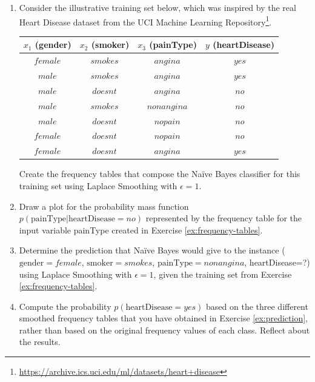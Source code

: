 \begin{enumerate}

\item \label{ex:frequency-tables} Consider the illustrative training set below, which was inspired by the real Heart Disease dataset from the UCI Machine Learning Repository\footnote{\url{https://archive.ics.uci.edu/ml/datasets/heart+disease}}.

\begin{center}
\begin{tabular}{|c|c|c||c|}\hline
$x_1$ (gender) & $x_2$ (smoker) & $x_3$ (painType) & $y$ (heartDisease) \\ \hline
$female$ & $smokes$ & $angina$ & $yes$ \\ \hline
$male$ & $smokes$ & $angina$ & $yes$ \\ \hline
$male$ & $doesnt$ & $angina$ & $no$ \\ \hline
$male$ & $smokes$ & $nonangina$ & $no$ \\ \hline
$male$ & $doesnt$ & $nopain$ & $no$ \\ \hline
$female$ & $doesnt$ & $nopain$ & $no$ \\ \hline
$female$ & $doesnt$ & $angina$ & $yes$\\ \hline
\end{tabular} 
\end{center}

Create the frequency tables that compose the Na\"ive Bayes classifier for this training set using Laplace Smoothing with $\epsilon=1$. 

\item \label{ex:pmf} Draw a plot for the probability mass function $p(\text{painType} | \text{heartDisease}=\textit{no})$ represented by the frequency table for the input variable painType created in Exercise \ref{ex:frequency-tables}.

\item \label{ex:prediction} Determine the prediction that Na\"ive Bayes would give to the instance ($\text{gender}=female$, $\text{smoker}=smokes$, $\text{painType}=nonangina$, heartDisease=?) using Laplace Smoothing with $\epsilon=1$, given the training set from Exercise \ref{ex:frequency-tables}.

\item \label{ex:laplace} Compute the probability $p(\text{heartDisease}=yes)$ based on the three different smoothed frequency tables that you have obtained in Exercise \ref{ex:prediction}, rather than based on the original frequency values of each class. Reflect about the results.

\end{enumerate}




